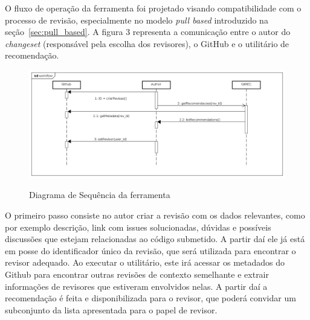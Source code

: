 \documentclass[preprint,review, 12pt]{elsarticle}
\begin{document}
   O fluxo de operação da ferramenta foi projetado visando compatibilidade com o processo de revisão, especialmente no modelo \textit{pull based} \cite{gousios2014} introduzido na seção~\ref{sec:pull_based}. A figura 3 representa a comunicação entre o autor do \textit{changeset} (responsável pela escolha dos revisores), o GitHub e o utilitário de recomendação.

   \begin{figure}[!htbp]
    \includegraphics[width=\textwidth]{diagrama_sequencia}\label{fig:diagrama_sequencia}
    \caption{Diagrama de Sequência da ferramenta}
  \end{figure}

  O primeiro passo consiste no autor criar a revisão com os dados relevantes, como por exemplo descrição, link com issues solucionadas, dúvidas e possíveis discussões que estejam relacionadas ao código submetido. A partir daí ele já está em posse do identificador único da revisão, que será utilizada para encontrar o revisor adequado. Ao executar o utilitário, este irá acessar os metadados do Github para encontrar outras revisões de contexto semelhante e extrair informações de revisores que estiveram envolvidos nelas. A partir daí a recomendação é feita e disponibilizada para o revisor, que poderá convidar um subconjunto da lista apresentada para o papel de revisor.
\end{document}
